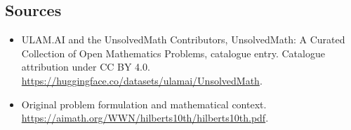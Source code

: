 \documentclass[11pt]{article}
\begin{document}
\subsection{Sources}
\begin{itemize}
\item[\hypertarget{source:statement:1}{S1}] ULAM.AI and the UnsolvedMath Contributors, UnsolvedMath: A Curated Collection of Open Mathematics Problems, catalogue entry. Catalogue attribution under CC BY 4.0.
\url{https://huggingface.co/datasets/ulamai/UnsolvedMath}.
\item[\hypertarget{source:statement:2}{S2}] Original problem formulation and mathematical context.
\url{https://aimath.org/WWN/hilberts10th/hilberts10th.pdf}.
\end{itemize}
\label{end:statement}
\end{document}
